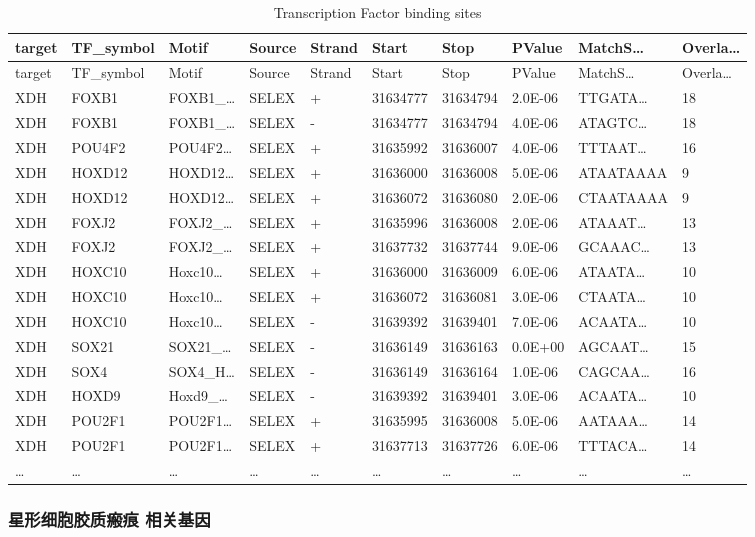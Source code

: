 \documentclass[
]{article}
\begin{document}
\begin{longtable}[]{@{}llllllllll@{}}
\caption{\label{tab:Transcription-Factor-binding-sites}Transcription Factor binding sites}\tabularnewline
\toprule
target & TF\_symbol & Motif & Source & Strand & Start & Stop & PValue & MatchS\ldots{} & Overla\ldots{}\tabularnewline
\midrule
\endfirsthead
\toprule
target & TF\_symbol & Motif & Source & Strand & Start & Stop & PValue & MatchS\ldots{} & Overla\ldots{}\tabularnewline
\midrule
\endhead
XDH & FOXB1 & FOXB1\_\ldots{} & SELEX & + & 31634777 & 31634794 & 2.0E-06 & TTGATA\ldots{} & 18\tabularnewline
XDH & FOXB1 & FOXB1\_\ldots{} & SELEX & - & 31634777 & 31634794 & 4.0E-06 & ATAGTC\ldots{} & 18\tabularnewline
XDH & POU4F2 & POU4F2\ldots{} & SELEX & + & 31635992 & 31636007 & 4.0E-06 & TTTAAT\ldots{} & 16\tabularnewline
XDH & HOXD12 & HOXD12\ldots{} & SELEX & + & 31636000 & 31636008 & 5.0E-06 & ATAATAAAA & 9\tabularnewline
XDH & HOXD12 & HOXD12\ldots{} & SELEX & + & 31636072 & 31636080 & 2.0E-06 & CTAATAAAA & 9\tabularnewline
XDH & FOXJ2 & FOXJ2\_\ldots{} & SELEX & + & 31635996 & 31636008 & 2.0E-06 & ATAAAT\ldots{} & 13\tabularnewline
XDH & FOXJ2 & FOXJ2\_\ldots{} & SELEX & + & 31637732 & 31637744 & 9.0E-06 & GCAAAC\ldots{} & 13\tabularnewline
XDH & HOXC10 & Hoxc10\ldots{} & SELEX & + & 31636000 & 31636009 & 6.0E-06 & ATAATA\ldots{} & 10\tabularnewline
XDH & HOXC10 & Hoxc10\ldots{} & SELEX & + & 31636072 & 31636081 & 3.0E-06 & CTAATA\ldots{} & 10\tabularnewline
XDH & HOXC10 & Hoxc10\ldots{} & SELEX & - & 31639392 & 31639401 & 7.0E-06 & ACAATA\ldots{} & 10\tabularnewline
XDH & SOX21 & SOX21\_\ldots{} & SELEX & - & 31636149 & 31636163 & 0.0E+00 & AGCAAT\ldots{} & 15\tabularnewline
XDH & SOX4 & SOX4\_H\ldots{} & SELEX & - & 31636149 & 31636164 & 1.0E-06 & CAGCAA\ldots{} & 16\tabularnewline
XDH & HOXD9 & Hoxd9\_\ldots{} & SELEX & - & 31639392 & 31639401 & 3.0E-06 & ACAATA\ldots{} & 10\tabularnewline
XDH & POU2F1 & POU2F1\ldots{} & SELEX & + & 31635995 & 31636008 & 5.0E-06 & AATAAA\ldots{} & 14\tabularnewline
XDH & POU2F1 & POU2F1\ldots{} & SELEX & + & 31637713 & 31637726 & 6.0E-06 & TTTACA\ldots{} & 14\tabularnewline
\ldots{} & \ldots{} & \ldots{} & \ldots{} & \ldots{} & \ldots{} & \ldots{} & \ldots{} & \ldots{} & \ldots{}\tabularnewline
\bottomrule
\end{longtable}

\hypertarget{ux661fux5f62ux7ec6ux80deux80f6ux8d28ux7622ux75d5-ux76f8ux5173ux57faux56e0}{%
\subsubsection{星形细胞胶质瘢痕 相关基因}\label{ux661fux5f62ux7ec6ux80deux80f6ux8d28ux7622ux75d5-ux76f8ux5173ux57faux56e0}}
\end{document}

